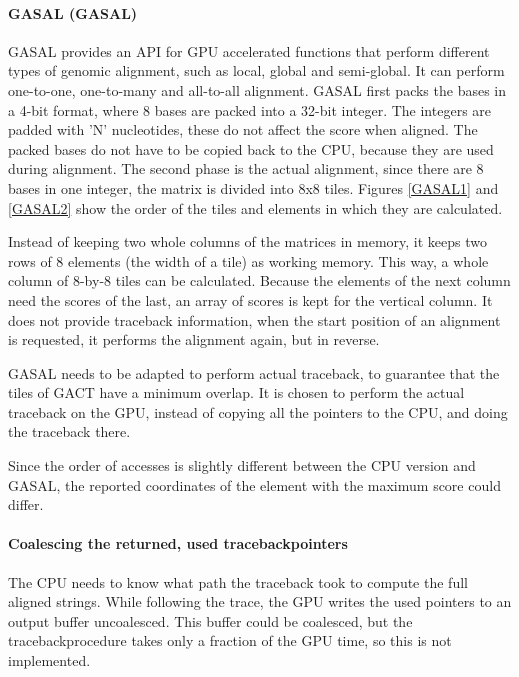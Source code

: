\documentclass[../main/thesis.tex]{subfiles}
\begin{document}
\paragraph{GASAL (GASAL)}
GASAL \cite{GASAL} provides an API for GPU accelerated functions that perform different types of genomic alignment, such as local, global and semi-global.
It can perform one-to-one, one-to-many and all-to-all alignment.
GASAL first packs the bases in a 4-bit format, where 8 bases are packed into a 32-bit integer.
The integers are padded with 'N' nucleotides, these do not affect the score when aligned.
The packed bases do not have to be copied back to the CPU, because they are used during alignment.
The second phase is the actual alignment, since there are 8 bases in one integer, the matrix is divided into 8x8 tiles.
Figures \ref{GASAL1} and \ref{GASAL2} show the order of the tiles and elements in which they are calculated.



Instead of keeping two whole columns of the matrices in memory, it keeps two rows of 8 elements (the width of a tile) as working memory.
This way, a whole column of 8-by-8 tiles can be calculated.
Because the elements of the next column need the scores of the last, an array of scores is kept for the vertical column.
It does not provide traceback information, when the start position of an alignment is requested, it performs the alignment again, but in reverse.

GASAL needs to be adapted to perform actual traceback, to guarantee that the tiles of GACT have a minimum overlap.
It is chosen to perform the actual traceback on the GPU, instead of copying all the pointers to the CPU, and doing the traceback there.

Since the order of accesses is slightly different between the CPU version and GASAL, the reported coordinates of the element with the maximum score could differ.



\paragraph{Coalescing the returned, used tracebackpointers}
The CPU needs to know what path the traceback took to compute the full aligned strings.
While following the trace, the GPU writes the used pointers to an output buffer uncoalesced.
This buffer could be coalesced, but the tracebackprocedure takes only a fraction of the GPU time, so this is not implemented.
\end{document}
